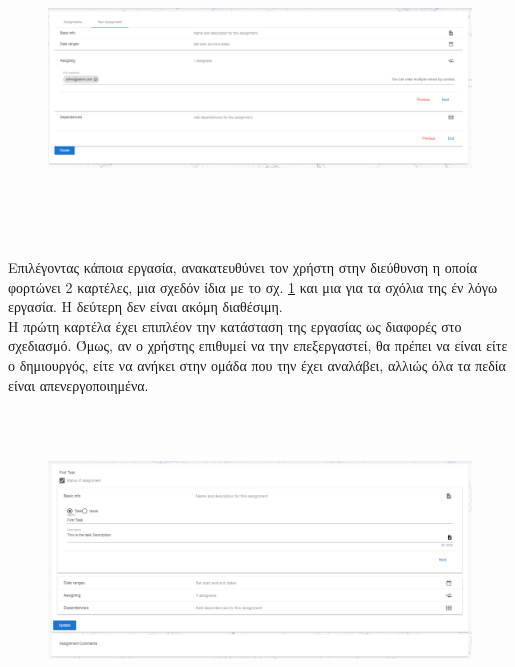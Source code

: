 \begin{figure}[!htb]
\includegraphics[width=\linewidth, height=8cm]{images/projectCreateAssignment.png}
\caption{}
\label{fig:projectCreateAssignment}
\end{figure}

\pSpace Επιλέγοντας κάποια εργασία, ανακατευθύνει τον χρήστη στην διεύθυνση  η οποία φορτώνει 2 καρτέλες, μια σχεδόν ίδια με το σχ. \ref{fig:projectCreateAssignment} και μια για τα σχόλια της έν λόγω εργασία. Η δεύτερη δεν είναι ακόμη διαθέσιμη.\\
\pSpace Η πρώτη καρτέλα έχει επιπλέον την κατάσταση της εργασίας ως διαφορές στο σχεδιασμό. Όμως, αν ο χρήστης επιθυμεί να την επεξεργαστεί, θα πρέπει να είναι είτε ο δημιουργός, είτε να ανήκει στην ομάδα που την έχει αναλάβει, αλλιώς όλα τα πεδία είναι απενεργοποιημένα.

\begin{figure}[!htb]
\includegraphics[width=\linewidth, height=8cm]{images/projectAssignementView.png}
\caption{}
\label{fig:projectAssignmentView}
\end{figure}

